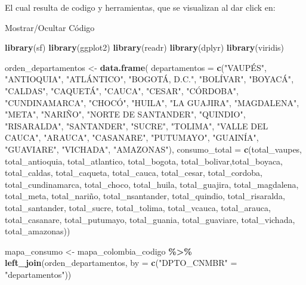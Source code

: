 \documentclass[
]{article}
\newenvironment{Shaded}{\begin{snugshade}}{\end{snugshade}}
\newcommand{\AttributeTok}[1]{\textcolor[rgb]{0.13,0.29,0.53}{#1}}
\newcommand{\FunctionTok}[1]{\textcolor[rgb]{0.13,0.29,0.53}{\textbf{#1}}}
\newcommand{\NormalTok}[1]{#1}
\newcommand{\OtherTok}[1]{\textcolor[rgb]{0.56,0.35,0.01}{#1}}
\newcommand{\SpecialCharTok}[1]{\textcolor[rgb]{0.81,0.36,0.00}{\textbf{#1}}}
\newcommand{\StringTok}[1]{\textcolor[rgb]{0.31,0.60,0.02}{#1}}
\begin{document}
El cual resulta de codigo y herramientas, que se visualizan al dar click
en:

Mostrar/Ocultar Código

\label{section2}
\begin{Shaded}
\begin{Highlighting}[]
\FunctionTok{library}\NormalTok{(sf)}
\FunctionTok{library}\NormalTok{(ggplot2)}
\FunctionTok{library}\NormalTok{(readr)}
\FunctionTok{library}\NormalTok{(dplyr)}
\FunctionTok{library}\NormalTok{(viridis)}

\NormalTok{orden\_departamentos }\OtherTok{\textless{}{-}} \FunctionTok{data.frame}\NormalTok{(}
  \AttributeTok{departamentos =} \FunctionTok{c}\NormalTok{(}\StringTok{"VAUPÉS"}\NormalTok{, }\StringTok{"ANTIOQUIA"}\NormalTok{, }\StringTok{"ATLÁNTICO"}\NormalTok{, }\StringTok{"BOGOTÁ, D.C."}\NormalTok{, }\StringTok{"BOLÍVAR"}\NormalTok{, }\StringTok{"BOYACÁ"}\NormalTok{, }\StringTok{"CALDAS"}\NormalTok{, }\StringTok{"CAQUETÁ"}\NormalTok{, }\StringTok{"CAUCA"}\NormalTok{, }\StringTok{"CESAR"}\NormalTok{, }\StringTok{"CÓRDOBA"}\NormalTok{, }\StringTok{"CUNDINAMARCA"}\NormalTok{, }\StringTok{"CHOCÓ"}\NormalTok{, }\StringTok{"HUILA"}\NormalTok{, }\StringTok{"LA GUAJIRA"}\NormalTok{, }\StringTok{"MAGDALENA"}\NormalTok{, }\StringTok{"META"}\NormalTok{, }\StringTok{"NARIÑO"}\NormalTok{, }\StringTok{"NORTE DE SANTANDER"}\NormalTok{, }\StringTok{"QUINDIO"}\NormalTok{, }\StringTok{"RISARALDA"}\NormalTok{, }\StringTok{"SANTANDER"}\NormalTok{, }\StringTok{"SUCRE"}\NormalTok{, }\StringTok{"TOLIMA"}\NormalTok{, }\StringTok{"VALLE DEL CAUCA"}\NormalTok{, }\StringTok{"ARAUCA"}\NormalTok{, }\StringTok{"CASANARE"}\NormalTok{, }\StringTok{"PUTUMAYO"}\NormalTok{, }\StringTok{"GUAINÍA"}\NormalTok{, }\StringTok{"GUAVIARE"}\NormalTok{, }\StringTok{"VICHADA"}\NormalTok{, }\StringTok{"AMAZONAS"}\NormalTok{),}
  \AttributeTok{consumo\_total =} \FunctionTok{c}\NormalTok{(total\_vaupes, total\_antioquia, total\_atlantico, total\_bogota, total\_bolivar,total\_boyaca, total\_caldas, total\_caqueta, total\_cauca, total\_cesar, total\_cordoba, total\_cundinamarca, total\_choco, total\_huila, total\_guajira, total\_magdalena, total\_meta, total\_nariño, total\_nsantander, total\_quindio, total\_risaralda, total\_santander, total\_sucre, total\_tolima, total\_vcauca, total\_arauca, total\_casanare, total\_putumayo, total\_guania, total\_guaviare, total\_vichada, total\_amazonas))}

\NormalTok{mapa\_consumo }\OtherTok{\textless{}{-}}\NormalTok{ mapa\_colombia\_codigo }\SpecialCharTok{\%\textgreater{}\%}
  \FunctionTok{left\_join}\NormalTok{(orden\_departamentos, }\AttributeTok{by =} \FunctionTok{c}\NormalTok{(}\StringTok{"DPTO\_CNMBR"} \OtherTok{=} \StringTok{"departamentos"}\NormalTok{)) }


\end{Highlighting}
\end{Shaded}
\end{document}

